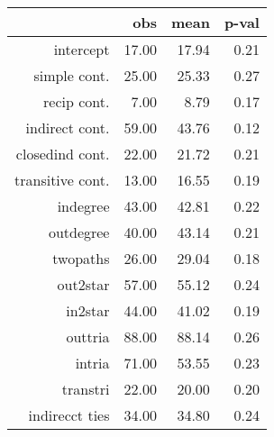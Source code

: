 \begin{table}[ht]
\centering
\begin{tabular}{rrrr}
  \hline
 & obs & mean & p-val \\ 
  \hline
intercept & 17.00 & 17.94 & 0.21 \\ 
  simple cont. & 25.00 & 25.33 & 0.27 \\ 
  recip cont. & 7.00 & 8.79 & 0.17 \\ 
  indirect cont. & 59.00 & 43.76 & 0.12 \\ 
  closedind cont. & 22.00 & 21.72 & 0.21 \\ 
  transitive cont. & 13.00 & 16.55 & 0.19 \\ 
  indegree & 43.00 & 42.81 & 0.22 \\ 
  outdegree & 40.00 & 43.14 & 0.21 \\ 
  twopaths & 26.00 & 29.04 & 0.18 \\ 
  out2star & 57.00 & 55.12 & 0.24 \\ 
  in2star & 44.00 & 41.02 & 0.19 \\ 
  outtria & 88.00 & 88.14 & 0.26 \\ 
  intria & 71.00 & 53.55 & 0.23 \\ 
  transtri & 22.00 & 20.00 & 0.20 \\ 
  indirecct ties & 34.00 & 34.80 & 0.24 \\ 
   \hline
\end{tabular}
\end{table}
